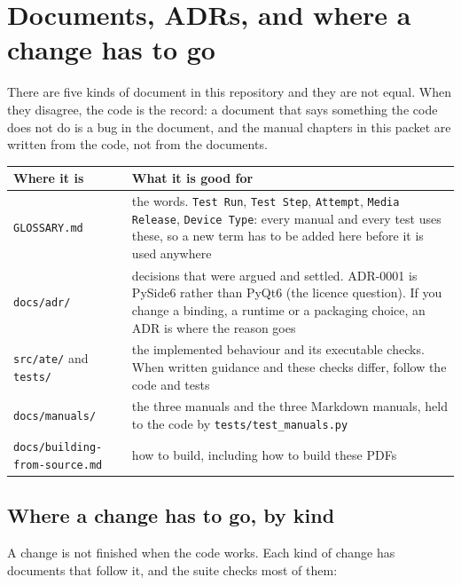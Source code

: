 \chapter{Documents, ADRs, and where a change has to go}\label{ch:docs}

There are five kinds of document in this repository and they are not equal. When they disagree, the
code is the record: a document that says something the code does not do is a bug in the document, and
the manual chapters in this packet are written from the code, not from the documents.

\begingroup\small
\begin{longtable}{p{4.4cm} p{8.2cm}}
\toprule
\textbf{Where it is} & \textbf{What it is good for} \\
\midrule
\endhead
\texttt{GLOSSARY.md} & the words. \texttt{Test Run}, \texttt{Test Step}, \texttt{Attempt},
  \texttt{Media Release}, \texttt{Device Type}: every manual and every test uses these, so a new
  term has to be added here before it is used anywhere \\
\texttt{docs/adr/} & decisions that were argued and settled. ADR-0001 is PySide6 rather than PyQt6
  (the licence question). If you change a binding, a runtime or a packaging choice, an ADR is where
  the reason goes \\
\texttt{src/ate/} and \texttt{tests/} & the implemented behaviour and its executable checks. When
  written guidance and these checks differ, follow the code and tests \\
\texttt{docs/manuals/} & the three manuals and the three Markdown manuals, held to the code by
  \texttt{tests/\allowbreak{}test\_\allowbreak{}manuals.py} \\
\texttt{docs/\allowbreak{}building-from-source.md} & how to build, including how to build these PDFs \\
\bottomrule
\end{longtable}
\endgroup

\section{Where a change has to go, by kind}

A change is not finished when the code works. Each kind of change has documents that follow it, and
the suite checks most of them:

